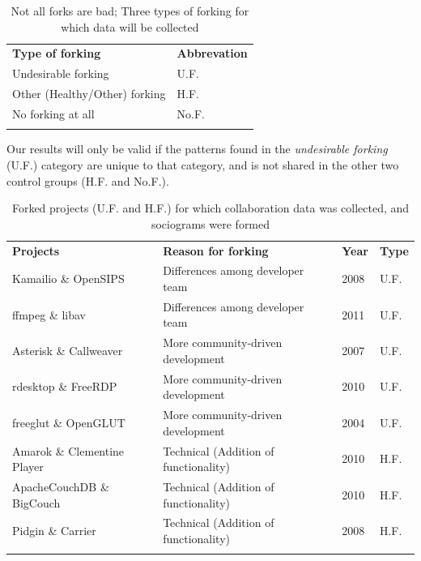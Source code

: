 \documentclass{acm_proc_article-sp}
\begin{document}
\begin{table}[!htbp]
\caption{Not all forks are bad; Three types of forking for which data will be collected}
\label{tableUndesirableForkingDataCollect} 
\begin{tabular}{p{} p{}}
\hline\noalign{\smallskip}
\textbf{Type of forking} & \textbf{Abbrevation} \\
\noalign{\smallskip}\hline\noalign{\smallskip}
Undesirable forking & U.F. \\ \hline
Other (Healthy/Other) forking & H.F. \\\hline
No forking at all & No.F. \\
\noalign{\smallskip}\hline
\end{tabular}
\end{table}

Our results will only be valid if the patterns found in the \textit{undesirable forking} (U.F.) category are unique to that category, and is not shared in the other two control groups (H.F. and No.F.).

\begin{table}[!ht]
\centering
\caption{Forked projects (U.F. and H.F.) for which collaboration data was collected, and sociograms were formed}
\label{forkedProjectsDataCollected}
\begin{tabular}{p{} p{} p{} p{}}
\hline\noalign{\smallskip}
\textbf{Projects} & \textbf{Reason for forking} & \textbf{Year} & \textbf{Type}\\
\noalign{\smallskip}\hline\noalign{\smallskip}
Kamailio \& OpenSIPS & Differences among developer team & 2008 & U.F.\\ \hline
ffmpeg \& libav & Differences among developer team & 2011 & U.F.\\ \hline
Asterisk \& Callweaver & More community-driven development & 2007 & U.F.\\ \hline
rdesktop \& FreeRDP  & More community-driven development & 2010 & U.F.\\ \hline
freeglut \& OpenGLUT & More community-driven development & 2004 & U.F.\\ \hline
Amarok \& Clementine Player & Technical (Addition of functionality) & 2010 & H.F.\\ \hline
ApacheCouchDB \& BigCouch & Technical (Addition of functionality) & 2010 & H.F.\\ \hline
Pidgin \& Carrier & Technical (Addition of functionality) & 2008 & H.F.\\
\noalign{\smallskip}\hline
\end{tabular}
\end{table}
\end{document}
